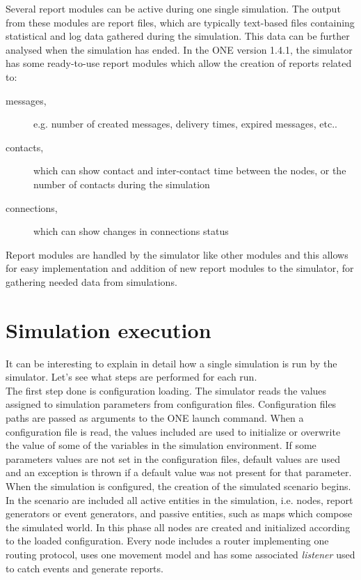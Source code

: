 Several report modules can be active during one single simulation. The output from these modules are report files, which are typically text-based files containing statistical and log data gathered during the simulation. This data can be further analysed when the simulation has ended. In the ONE version 1.4.1, the simulator has some ready-to-use report modules which allow the creation of reports related to:

\begin{description}
\item[messages,] e.g. number of created messages, delivery times, expired messages, etc..
\item[contacts,] which can show contact and inter-contact time between the nodes, or the number of contacts during the simulation
\item[connections,] which can show changes in connections status
\end{description}

Report modules are handled by the simulator like other modules and this allows for easy implementation and addition of new report modules to the simulator, for gathering needed data from simulations.


\section{Simulation execution}
\label{esecuzioneONE}
It can be interesting to explain in detail how a single simulation is run by the simulator. Let's see what steps are performed for each run.
\\

The first step done is configuration loading. The simulator reads the values assigned to simulation parameters from configuration files. Configuration files paths are passed as arguments to the ONE launch command. When a configuration file is read, the values included are used to initialize or overwrite the value of some of the variables in the simulation environment. If some parameters values are not set in the configuration files, default values are used and an exception is thrown if a default value was not present for that parameter.
\\

When the simulation is configured, the creation of the simulated scenario begins. In the scenario are included all active entities in the simulation, i.e. nodes, report generators or event generators, and passive entities, such as maps which compose the simulated world. In this phase all nodes are created and initialized according to the loaded configuration. Every node includes a router implementing one routing protocol, uses one movement model and has some associated \textit{listener} used to catch events and generate reports.
\\

